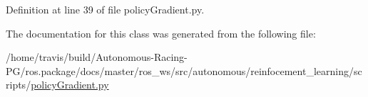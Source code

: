 Definition at line 39 of file policy\+Gradient.\+py.



The documentation for this class was generated from the following file\+:\begin{DoxyCompactItemize}
\item 
/home/travis/build/\+Autonomous-\/\+Racing-\/\+P\+G/ros.\+package/docs/master/ros\+\_\+ws/src/autonomous/reinfocement\+\_\+learning/scripts/\hyperlink{policy_gradient_8py}{policy\+Gradient.\+py}\end{DoxyCompactItemize}
